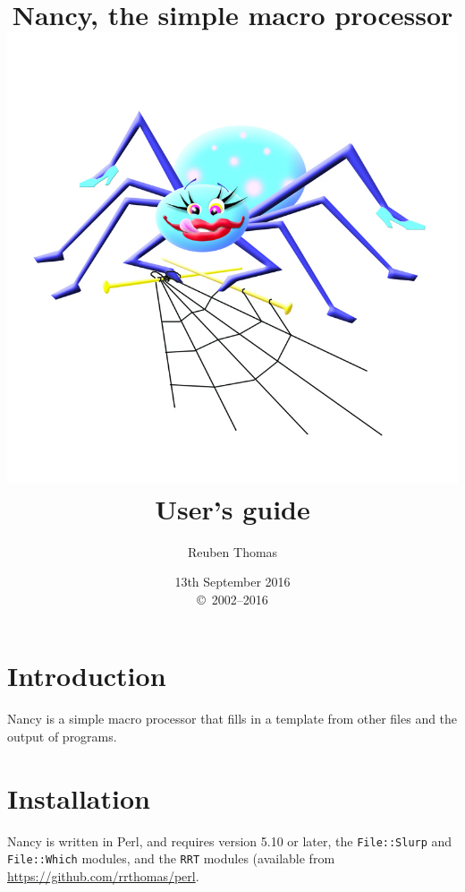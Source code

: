 \documentclass[a4paper,english]{scrartcl}
\begin{document}
\title{Nancy, the simple macro processor\\\includegraphics[scale=0.45]{logo/nancy.png}
\\User’s guide}
\date{13th September 2016\\\copyright\ 2002--2016} %
\author{Reuben Thomas}
\maketitle

\section{Introduction}

Nancy is a simple macro processor that fills in a template from other files and the output of programs.

\section{Installation}

Nancy is written in Perl, and requires version 5.10 or later, the \verb|File::Slurp| and \verb|File::Which| modules, and the \verb|RRT| modules (available from \url{https://github.com/rrthomas/perl}.
\end{document}
